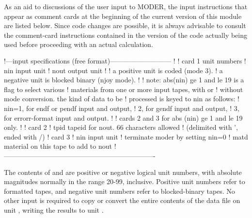 As an aid to discussions of the user input to MODER, the input
instructions that appear as comment cards at the beginning of the
current version of this module are listed below.  Since code changes
are possible, it is always advisable to consult the comment-card
instructions contained in the version of the code actually being
used before proceeding with an actual calculation.

\newpage
\small
\begin{ccode}

   !---input specifications (free format)---------------------------
   !
   ! card 1       unit numbers
   !      nin     input unit
   !      nout    output unit
   !
   !  a positive unit is coded (mode 3).
   !  a negative unit is blocked binary (njoy mode).
   !
   !  note: abs(nin) ge 1 and le 19 is a flag to select various
   !        materials from one or more input tapes, with or
   !        without mode conversion.  the kind of data to be
   !        processed is keyed to nin as follows:
   !             nin=1, for endf or pendf input and output,
   !                 2, for gendf input and output,
   !                 3, for errorr-format input and output.
   !
   !      cards 2 and 3 for abs (nin) ge 1 and le 19 only.
   !
   ! card 2
   !      tpid    tapeid for nout.  66 characters allowed
   !              (delimited with ', ended with /)
   ! card 3
   !      nin     input unit
   !              terminate moder by setting nin=0
   !      matd    material on this tape to add to nout
   !-------------------------------------------------------------------

\end{ccode}
\normalsize

\noindent
The contents of  and  are positive or negative
logical unit numbers, with absolute magnitudes normally in the
range 20-99, inclusive.  Positive unit numbers refer to formatted tapes,
and negative unit numbers refer to blocked-binary tapes.  No other
input is required to copy or convert the entire contents of the data
file on unit , writing the results to unit .

